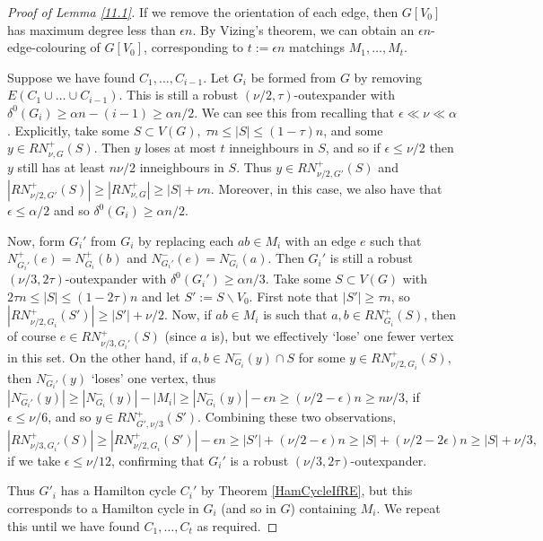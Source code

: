 \documentclass[10pt,letterpaper, reqno]{amsart}
\theoremstyle{definition}
\numberwithin{equation}{section}
\begin{document}
\begin{proof}[Proof of Lemma \ref{11.1}]	
	If we remove the orientation of each edge, then $G[V_0]$ has maximum degree less than $\epsilon n$. By Vizing's theorem, we can obtain an $\epsilon n$-edge-colouring of $G[V_0]$, corresponding to $t:= \epsilon n$ matchings $M_1,\dots,M_t$.  
	
	Suppose we have found $C_1,\dots,C_{i-1}$. Let $G_i$ be formed from $G$ by removing $E(C_1 \cup \dots \cup C_{i-1})$. This is still a robust $(\nu/2,\tau)$-outexpander with $\delta ^0(G_i) \geq \alpha n - (i-1) \geq \alpha n/2$. We can see this from recalling that $\epsilon \ll \nu \ll \alpha$. Explicitly, take some $S \subset V(G), \ \tau n \leq |S| \leq (1-\tau)n$, and some $y \in RN^+_{\nu,G}(S)$. Then $y$ loses at most $t$ inneighbours in $S$, and so if $\epsilon \leq \nu /2$ then $y$ still has at least $n \nu/2 $ inneighbours in $S$. Thus $y \in RN^+_{\nu/2, G'}(S)$ and $|RN^+_{\nu/2,G'}(S)| \geq |RN^+_{\nu,G}| \geq |S| + \nu n$. Moreover, in this case, we also have that $\epsilon \leq \alpha/2$ and so $\delta^0(G_i) \geq \alpha n/2$.
	
	Now, form $G_i'$ from $G_i$ by replacing each $ab \in M_i$ with an edge $e$ such that $N_{G_i'}^+(e) = N_{G_i}^+(b)$ and $N_{G_i'}^-(e) = N_{G_i}^-(a)$. Then $G_i'$ is still a robust $(\nu/3,2\tau)$-outexpander with $\delta^0(G_i') \geq \alpha n/3$. Take some $S \subset V(G)$ with $2\tau n \leq |S| \leq (1-2\tau)n$ and let $S':=S \backslash V_0$. First note that $|S'| \geq \tau n$, so $|RN^+_{\nu/2,G_i}(S')| \geq |S'| + \nu/2.$ Now, if $ab \in M_i$ is such that $a,b \in RN^+_{G_i}(S)$, then of course $e \in RN^+_{\nu/3, G_i'}(S)$ (since $a$ is), but we effectively `lose' one fewer vertex in this set. On the other hand, if $a,b \in N_{G_i}^-(y) \cap S$ for some $y \in RN^+_{\nu/2, G_i}(S)$, then $N_{G_i'}^-(y)$ `loses' one vertex, thus $|N_{G_i'}^-(y)| \geq |N_{G_i}^-(y)| - |M_i| \geq  |N_{G_i}^-(y)| - \epsilon n \geq (\nu/2 - \epsilon)n \geq n\nu/3$, if $\epsilon \leq \nu/6$, and so $y \in RN^+_{G', \nu/3}(S')$. Combining these two observations, 
	$$|RN^+_{\nu/3, G_i'}(S)| \geq |RN^+_{\nu/2, G_i}(S')| - \epsilon n \geq |S'| + (\nu/2-\epsilon)n \geq |S| + (\nu/2 - 2\epsilon)n \geq |S| + \nu/3,$$ if we take $\epsilon \leq \nu /12$, confirming that $G_i'$ is a robust $(\nu/3,2\tau)$-outexpander.
	
	Thus $G'_i$ has a Hamilton cycle $C_i'$ by Theorem \ref{HamCycleIfRE}, but this corresponds to a Hamilton cycle in $G_i$ (and so in $G$) containing $M_i$. We repeat this until we have found $C_1,\dots, C_t$ as required. 
\end{proof}
\end{document}
